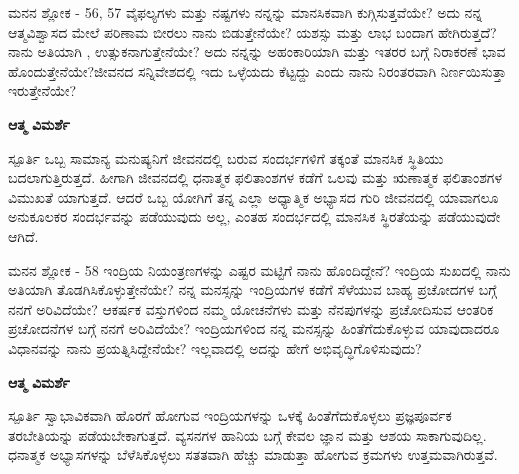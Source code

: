 \newpage
\begin{mananam}{\kanfont ಮನನ ಶ್ಲೋಕ - \textenglish{56, 57}}
\footnotesize \mananamfont ವೈಫಲ್ಯಗಳು ಮತ್ತು ನಷ್ಟಗಳು ನನ್ನನ್ನು ಮಾನಸಿಕವಾಗಿ  ಕುಗ್ಗಿಸುತ್ತವೆಯೇ? ಅದು ನನ್ನ ಆತ್ಮವಿಶ್ವಾಸದ ಮೇಲೆ ಪರಿಣಾಮ ಬೀರಲು ನಾನು ಬಿಡುತ್ತೇನೆಯೇ? ಯಶಸ್ಸು ಮತ್ತು ಲಾಭ ಬಂದಾಗ ಹೇಗಿರುತ್ತದೆ? ನಾನು ಅತಿಯಾಗಿ , ಉತ್ಸುಕನಾಗುತ್ತೇನೆಯೇ? ಅದು ನನ್ನನ್ನು ಅಹಂಕಾರಿಯಾಗಿ ಮತ್ತು ಇತರರ ಬಗ್ಗೆ ನಿರಾಕರಣೆ ಭಾವ ಹೊಂದುತ್ತೇನೆಯೇ?ಜೀವನದ ಸನ್ನಿವೇಶದಲ್ಲಿ ಇದು ಒಳ್ಳೆಯದು ಕೆಟ್ಟದ್ದು ಎಂದು ನಾನು ನಿರಂತರವಾಗಿ ನಿರ್ಣಯಿಸುತ್ತಾ ಇರುತ್ತೇನೆಯೇ?
\end{mananam}
\WritingHand\enspace\textbf{ಆತ್ಮ ವಿಮರ್ಶೆ}
\begin{inspiration}{\kanfont ಸ್ಪೂರ್ತಿ}
\footnotesize \mananamfont ಒಬ್ಬ ಸಾಮಾನ್ಯ ಮನುಷ್ಯನಿಗೆ ಜೀವನದಲ್ಲಿ ಬರುವ ಸಂದರ್ಭಗಳಿಗೆ ತಕ್ಕಂತೆ ಮಾನಸಿಕ ಸ್ಥಿತಿಯು ಬದಲಾಗುತ್ತಿರುತ್ತದೆ. ಹೀಗಾಗಿ ಜೀವನದಲ್ಲಿ ಧನಾತ್ಮಕ ಫಲಿತಾಂಶಗಳ ಕಡೆಗೆ ಒಲವು ಮತ್ತು ಋಣಾತ್ಮಕ ಫಲಿತಾಂಶಗಳ ವಿಮುಖತೆ ಯಾಗುತ್ತದೆ. ಆದರೆ ಒಬ್ಬ ಯೋಗಿಗೆ ತನ್ನ ಎಲ್ಲಾ ಅಧ್ಯಾತ್ಮಿಕ ಅಭ್ಯಾಸದ ಗುರಿ ಜೀವನದಲ್ಲಿ ಯಾವಾಗಲೂ ಅನುಕೂಲಕರ ಸಂದರ್ಭವನ್ನು ಪಡೆಯುವುದು ಅಲ್ಲ, ಎಂತಹ ಸಂದರ್ಭದಲ್ಲಿ ಮಾನಸಿಕ ಸ್ಥಿರತೆಯನ್ನು ಪಡೆಯುವುದೇ ಆಗಿದೆ.
\end{inspiration}
\newpage

\begin{mananam}{\kanfont ಮನನ ಶ್ಲೋಕ - \textenglish{58}}
\footnotesize \mananamfont ಇಂದ್ರಿಯ ನಿಯಂತ್ರಣಗಳನ್ನು ಎಷ್ಟರ ಮಟ್ಟಿಗೆ ನಾನು ಹೊಂದಿದ್ದೇನೆ? ಇಂದ್ರಿಯ ಸುಖದಲ್ಲಿ ನಾನು ಅತಿಯಾಗಿ ತೊಡಗಿಸಿಕೊಳ್ಳುತ್ತೇನೆಯೇ? ನನ್ನ ಮನಸ್ಸನ್ನು ಇಂದ್ರಿಯಗಳ ಕಡೆಗೆ ಸೆಳೆಯುವ ಬಾಹ್ಯ ಪ್ರಚೋದಗಳ ಬಗ್ಗೆ ನನಗೆ ಅರಿವಿದೆಯೇ? ಆಕರ್ಷಕ ವಸ್ತುಗಳಿಂದ ನಮ್ಮ ಯೋಚನೆಗಳು ಮತ್ತು ನೆನಪುಗಳನ್ನು ಪ್ರಚೋದಿಸುವ ಆಂತರಿಕ ಪ್ರಚೋದನೆಗಳ ಬಗ್ಗೆ ನನಗೆ ಅರಿವಿದೆಯೇ? ಇಂದ್ರಿಯಗಳಿಂದ ನನ್ನ ಮನಸ್ಸನ್ನು ಹಿಂತೆಗೆದುಕೊಳ್ಳುವ ಯಾವುದಾದರೂ ವಿಧಾನವನ್ನು ನಾನು ಪ್ರಯತ್ನಿಸಿದ್ದೇನೆಯೇ? ಇಲ್ಲವಾದಲ್ಲಿ ಅದನ್ನು ಹೇಗೆ ಅಭಿವೃದ್ಧಿಗೊಳಿಸುವುದು?
\end{mananam}
\WritingHand\enspace\textbf{ಆತ್ಮ ವಿಮರ್ಶೆ}
\begin{inspiration}{\kanfont ಸ್ಪೂರ್ತಿ}
\footnotesize \mananamfont ಸ್ವಾಭಾವಿಕವಾಗಿ ಹೊರಗೆ ಹೋಗುವ ಇಂದ್ರಿಯಗಳನ್ನು ಒಳಕ್ಕೆ ಹಿಂತೆಗೆದುಕೊಳ್ಳಲು ಪ್ರಜ್ಞಪೂರ್ವಕ ತರಬೇತಿಯನ್ನು ಪಡೆಯಬೇಕಾಗುತ್ತದೆ. ವ್ಯಸನಗಳ ಹಾನಿಯ ಬಗ್ಗೆ ಕೇವಲ ಜ್ಞಾನ ಮತ್ತು ಆಶಯ ಸಾಕಾಗುವುದಿಲ್ಲ. ಧನಾತ್ಮಕ ಅಭ್ಯಾಸಗಳನ್ನು ಬೆಳೆಸಿಕೊಳ್ಳಲು ಸತತವಾಗಿ ಹೆಚ್ಚು ಮಾಡುತ್ತಾ ಹೋಗುವ ಕ್ರಮಗಳು ಉತ್ತಮವಾಗಿರುತ್ತವೆ.
\end{inspiration}
\newpage

